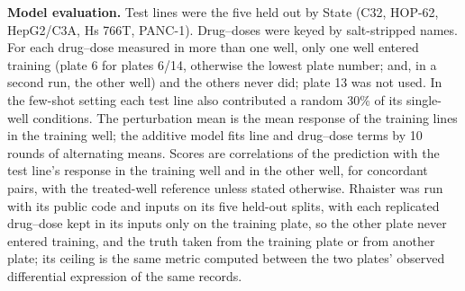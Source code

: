 \documentclass[pdflatex,sn-nature]{sn-jnl}
\begin{document}
\textbf{Model evaluation.} Test lines were the five held out by State (C32, HOP-62, HepG2/C3A, Hs 766T, PANC-1). Drug--doses were keyed by salt-stripped names. For each drug--dose measured in more than one well, only one well entered training (plate 6 for plates 6/14, otherwise the lowest plate number; and, in a second run, the other well) and the others never did; plate 13 was not used. In the few-shot setting each test line also contributed a random 30\% of its single-well conditions. The perturbation mean is the mean response of the training lines in the training well; the additive model fits line and drug--dose terms by 10 rounds of alternating means. Scores are correlations of the prediction with the test line's response in the training well and in the other well, for concordant pairs, with the treated-well reference unless stated otherwise. Rhaister was run with its public code and inputs on its five held-out splits\cite{rhaister2026}, with each replicated drug--dose kept in its inputs only on the training plate, so the other plate never entered training, and the truth taken from the training plate or from another plate; its ceiling is the same metric computed between the two plates' observed differential expression of the same records.
\end{document}
